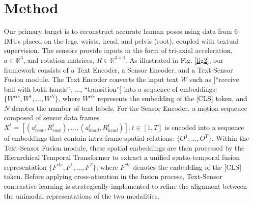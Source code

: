 \documentclass[letterpaper]{article} %
\begin{document}
\section{Method}
Our primary target is to reconstruct accurate human poses using data from 6 IMUs placed on the legs, wrists, head, and pelvis (root), coupled with textual supervision. The sensors provide inputs in the form of tri-axial acceleration, $a \in \mathbb{R}^{3}$, and rotation matrices, $R \in \mathbb{R}^{3\times3}$.
As illustrated in Fig. \ref{fig2}, our framework consists of a Text Encoder, a Sensor Encoder, and a Text-Sensor Fusion module.
The Text Encoder converts the input text $W$ such as [“receive ball with both hands”, ..., “transition”] into a sequence of embeddings: $\{W^{cls}, W^{1}, ..., W^{N}\}$, where $W^{cls}$ represents the embedding of the [CLS] token, and $N$ denotes the number of text labels.
For the Sensor Encoder,
a motion sequence composed of sensor data frames
$X^{t}=[(a_{root}^t,R_{root}^t),..., (a_{head}^t,R_{head}^t)], t \in [1,T]$
is encoded into a sequence of embeddings that contain intra-frame spatial relations: $\{O^{1}, ..., O^{T} \}$.
Within the Text-Sensor Fusion module, these spatial embeddings are then processed by the Hierarchical Temporal Transformer to extract a unified spatio-temporal fusion representation $\{{F^{cls}, F^{1}, ..., F^{T}}\}$, where $F^{cls}$ denotes the embedding of the [CLS] token.
Before applying cross-attention in the fusion process, Text-Sensor contrastive learning is strategically implemented to refine the alignment between the unimodal representations of the two modalities.
\end{document}
